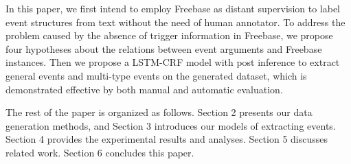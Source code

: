 In this paper, we first intend to employ Freebase as distant supervision to label event structures from text without the need of human annotator. To address the problem caused by the absence of trigger information in Freebase, we propose four hypotheses about the relations between event arguments and Freebase instances. Then we propose a LSTM-CRF model with post inference to extract general events and multi-type events on the generated dataset, which is demonstrated effective by both manual and automatic evaluation.

The rest of the paper is organized as follows. Section 2 presents our data generation methods, and Section 3 introduces our models of extracting events. Section 4 provides the experimental results and analyses. Section 5 discusses related work. Section 6 concludes this paper.

